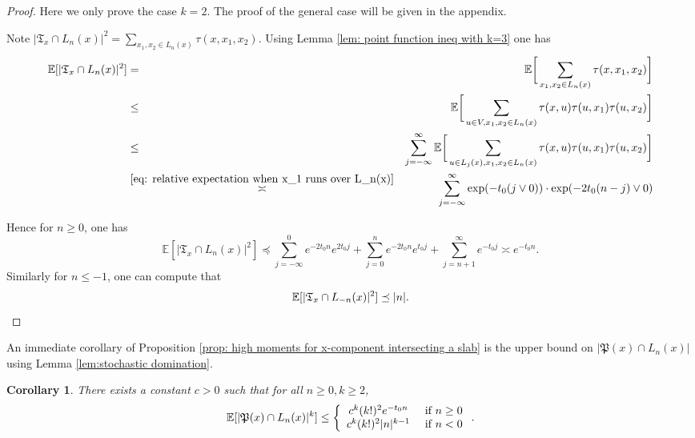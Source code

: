 \documentclass[12pt]{article}
\newtheorem{corollary}[theorem]{Corollary}
\numberwithin{equation}{section}
\newcommand{\1}{\mathbf{1}}
\begin{document}
 \begin{proof}	
Here we only prove the case $k=2$. The proof of the general case will be given in the appendix.

Note $|\mathfrak{T}_x\cap L_n(x)|^2=\sum_{x_1,x_2\in L_n(x)}{\tau(x,x_1,x_2)}$. Using Lemma \ref{lem: point function ineq with k=3} one has 
\begin{eqnarray}
\mathbb{E}[|\mathfrak{T}_x\cap L_n(x)|^2]&=&\mathbb{E}\bigg[\sum_{x_1,x_2\in L_n(x)}{\tau(x,x_1,x_2)}\bigg]\nonumber\\
&\leq&\mathbb{E}\bigg[\sum_{u\in V,x_1,x_2\in L_n(x)}{\tau(x,u)\tau(u,x_1)\tau(u,x_2)}\bigg]\nonumber\\
&\leq&\sum_{j=-\infty}^{\infty}\mathbb{E}\bigg[\sum_{u\in L_j(x),x_1,x_2\in L_n(x)}{\tau(x,u)\tau(u,x_1)\tau(u,x_2)}\bigg]\nonumber\\
&\stackrel{\eqref{eq: relative expectation when x_1 runs over L_n(x)} }{\asymp }&
\sum_{j=-\infty}^{\infty}\exp(-t_0(j\vee0))\cdot \exp(-2t_0(n-j)\vee0)
\end{eqnarray}

Hence for $n\geq0$, 
one has 
\[
\mathbb{E}[|\mathfrak{T}_x\cap L_n(x)|^2]\preceq \sum_{j=-\infty}^{0}e^{-2t_0n}e^{2t_0j}+
\sum_{j=0}^{n}e^{-2t_0n}e^{t_0j}+\sum_{j=n+1}^{\infty}e^{-t_0j}\asymp e^{-t_0n}.
\]
Similarly for $n\leq-1$, one can compute that 
\[
\mathbb{E}[|\mathfrak{T}_x\cap L_{-n}(x)|^2]\preceq |n|.\qedhere
\]
 \end{proof}
 
 An immediate corollary of Proposition \ref{prop: high moments for x-component intersecting a slab} is the upper bound on $|\mathfrak{P}(x)\cap L_n(x)|$ using Lemma \ref{lem:stochastic domination}. 
 \begin{corollary}\label{cor: high moments for the past}
 	There exists a constant $c>0$ such that for all $n\geq0,k\geq2$, 
 	\[
 	\mathbb{E}[|\mathfrak{P}(x)\cap L_n(x)|^k]\leq \left\{
 	\begin{array}{cc}
 	c^k(k!)^2e^{-t_0n} &\textnormal{ if }n\geq0\\
 		c^k(k!)^2|n|^{k-1} & \textnormal{ if }n<0
 	\end{array}
 	\right..
 	\]
 \end{corollary}
 
\end{document}
